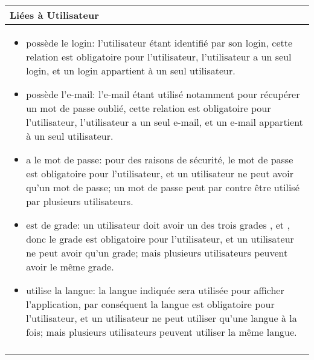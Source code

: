 \documentclass[a4paper,10pt]{article}
\begin{document}
\begin{tabu}{X}
\textbf{Liées à Utilisateur}\\
\toprule

\begin{itemize}
    \item possède le login: l'utilisateur étant identifié par son login, cette relation est obligatoire pour l'utilisateur, l'utilisateur a un seul login, et un login appartient à un seul utilisateur.
    \item possède l'e-mail: l'e-mail étant utilisé notamment pour récupérer un mot de passe oublié, cette relation est obligatoire pour l'utilisateur, l'utilisateur a un seul e-mail, et un e-mail appartient à un seul utilisateur.
    \item a le mot de passe: pour des raisons de sécurité, le mot de passe est obligatoire pour l'utilisateur, et un utilisateur ne peut avoir qu'un mot de passe; un mot de passe peut par contre être utilisé par plusieurs utilisateurs.
    \item est de grade: un utilisateur doit avoir un des trois grades ,  et , donc le grade est obligatoire pour l'utilisateur, et un utilisateur ne peut avoir qu'un grade; mais plusieurs utilisateurs peuvent avoir le même grade.
    \item utilise la langue: la langue indiquée sera utilisée pour afficher l'application, par conséquent la langue est obligatoire pour l'utilisateur, et un utilisateur ne peut utiliser qu'une langue à la fois; mais plusieurs utilisateurs peuvent utiliser la même langue.
\end{itemize}
\\\\
\end{tabu}
\end{document}
